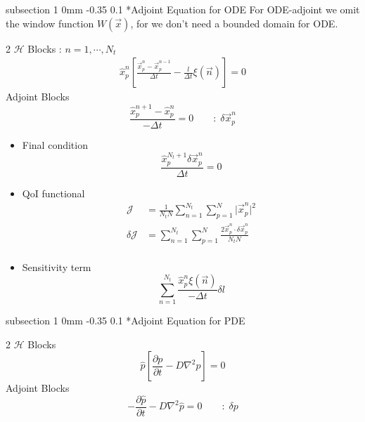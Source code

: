 \documentclass[11pt]{article}
\makeatletter
\renewcommand{\subsection}{\@startsection
{subsection}%
{1}%
{0mm}%
{-0.35\baselineskip}%
{0.1\baselineskip}%
{\normalfont\large\bfseries\color{brown}}}%
\def\Dpartial#1#2{ \frac{\partial #1}{\partial #2} }
\newcommand{\vn}{\vec{n}}
\newcommand{\vx}{\vec{x}}
\newcommand{\xp}{\vec{x}_p}
\newcommand{\Dt}{\Delta t}
\newcommand{\xph}{\hat{x}_p}
\newcommand{\cH}{\mathcal{H}}
\newcommand{\cJ}{\mathcal{J}}
\makeatother
\begin{document}
\subsection*{Adjoint Equation for ODE}
For ODE-adjoint we omit the window function $W(\vx)$, for we don't need a bounded domain for ODE.
\begin{multicols}{2}
$\cH$ Blocks : $n=1, \cdots , N_t$
\begin{equation*}
\begin{split}
\xph^n\left[ \frac{\xp^n - \xp^{n-1}}{\Dt} - \frac{l}{\Dt}\xi(\vn) \right] = 0
\end{split}
\end{equation*}
Adjoint Blocks
\begin{equation*}
\frac{\xph^{n+1} - \xph^n}{-\Dt} = 0 \qquad :\;\delta\xp^n
\end{equation*}
\end{multicols}
\begin{itemize}
\item Final condition
\begin{equation*}
\frac{\xph^{N_t+1}\delta\xp^n}{\Dt} = 0
\end{equation*}
\item QoI functional
\begin{equation*}
\begin{split}
\cJ &= \frac{1}{N_tN}\sum_{n=1}^{N_t}\sum_{p=1}^{N}\vert \xp^n \vert^2\\
\delta \cJ &= \sum_{n=1}^{N_t}\sum_{p=1}^{N} \frac{2\xp^n\cdot \delta\xp^n}{N_tN}\\
\end{split}
\end{equation*}
\item Sensitivity term
\begin{equation*}
\sum_{n=1}^{N_t}\frac{\xph^{n}\xi(\vn)}{-\Dt}\delta l
\end{equation*}
\end{itemize}

\subsection*{Adjoint Equation for PDE}

\begin{multicols}{2}
$\cH$ Blocks 
\begin{equation*}
\hat{p}\left[ \Dpartial{p}{t} - D\nabla^2p \right] = 0
\end{equation*}
Adjoint Blocks
\begin{equation*}
-\Dpartial{\hat{p}}{t} - D\nabla^2\hat{p} = 0 \qquad :\;\delta p
\end{equation*}
\end{multicols}
\end{document}
